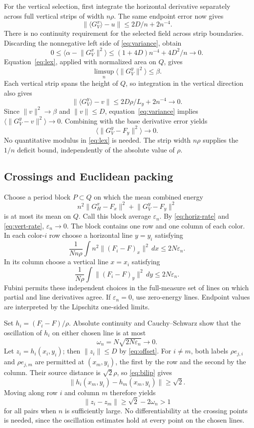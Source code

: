 \documentclass[
  11pt,
]{article}
\theoremstyle{remark}\newtheorem{remark}[theorem]{Remark}
\newcommand{\norm}[1]{\lVert#1\rVert}\newcommand{\ip}[2]{\langle#1,#2\rangle}
\newcommand{\av}[1]{\langle#1\rangle}\newcommand{\dimA}{\dim_{\mathrm A}}
\begin{document}
For the vertical selection, first integrate the horizontal derivative separately across full vertical strips of width $n\rho$. The same endpoint error now gives
\[
 \norm{\av{G_V^x}-u}\le2D/n+2n^{-4}.
\]
There is no continuity requirement for the selected field across strip boundaries. Discarding the nonnegative left side of \eqref{eq:variance}, obtain
\[
 0\le\av{\alpha-\norm{G_V^x}^2}
 \le(1+4D)n^{-4}+4D^2/n\longrightarrow0.
\]
Equation~\eqref{eq:lex}, applied with normalized area on $Q$, gives
\[
 \limsup_n\av{\norm{G_V^y}^2}\le\beta.
\]
Each vertical strip spans the height of $Q$, so integration in the vertical direction also gives
\[
 \norm{\av{G_V^y}-v}\le2D\rho/L_y+2n^{-4}\longrightarrow0.
\]
Since $\norm v^2\to\beta$ and $\norm v\le D$, equation~\eqref{eq:variance} implies $\av{\norm{G_V^y-v}^2}\to0$. Combining with the base derivative error yields
\begin{equation}\label{eq:vert-rate}
 \av{\norm{G_V^y-F_y}^2}\longrightarrow0.
\end{equation}
No quantitative modulus in \eqref{eq:lex} is needed. The strip width $n\rho$ supplies the $1/n$ deficit bound, independently of the absolute value of $\rho$.

\subsection{Crossings and Euclidean packing}
Choose a period block $P\subset Q$ on which the mean combined energy
\[
 n^2\norm{G_H^x-F_x}^2+\norm{G_V^y-F_y}^2
\]
is at most its mean on $Q$. Call this block average $\varepsilon_n$. By \eqref{eq:horiz-rate} and \eqref{eq:vert-rate}, $\varepsilon_n\to0$. The block contains one row and one column of each color. In each color-$i$ row choose a horizontal line $y=y_i$ satisfying
\[
 \frac{1}{Nn\rho}\int n^2\norm{(F_i-F)_x}^2\,dx
 \le2N\varepsilon_n.
\]
In its column choose a vertical line $x=x_i$ satisfying
\[
 \frac{1}{N\rho}\int\norm{(F_i-F)_y}^2\,dy
 \le2N\varepsilon_n.
\]
Fubini permits these independent choices in the full-measure set of lines on which partial and line derivatives agree. If $\varepsilon_n=0$, use zero-energy lines. Endpoint values are interpreted by the Lipschitz one-sided limits.

Set $h_i=(F_i-F)/\rho$. Absolute continuity and Cauchy--Schwarz show that the oscillation of $h_i$ on either chosen line is at most
\[
 \omega_n=N\sqrt{2N\varepsilon_n}\longrightarrow0.
\]
Let $z_i=h_i(x_i,y_i)$; then $\norm{z_i}\le D$ by \eqref{eq:offset}. For $i\ne m$, both labels $\rho e_{j,i}$ and $\rho e_{j,m}$ are permitted at $(x_m,y_i)$, the first by the row and the second by the column. Their source distance is $\sqrt2\rho$, so \eqref{eq:bilip} gives
\[
 \norm{h_i(x_m,y_i)-h_m(x_m,y_i)}\ge\sqrt2.
\]
Moving along row $i$ and column $m$ therefore yields
\[
 \norm{z_i-z_m}\ge\sqrt2-2\omega_n>1
\]
for all pairs when $n$ is sufficiently large. No differentiability at the crossing points is needed, since the oscillation estimates hold at every point on the chosen lines.
\end{document}

